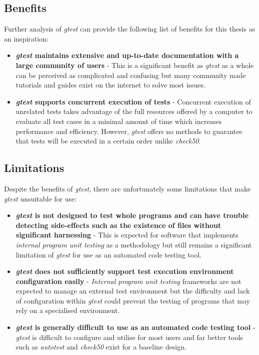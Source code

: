 \documentclass[hidelinks]{report}
\begin{document}
\subsection{Benefits}

Further analysis of \textit{gtest} can provide the following list of benefits for this thesis as an inspiration:
\begin{itemize}
	\item \textbf{\textit{gtest} maintains extensive and up-to-date documentation with a large community of users} - This is a significant benefit as \textit{gtest} as a whole can be perceived as complicated and confusing but many community made tutorials and guides exist on the internet to solve most issues.
	\item \textbf{\textit{gtest} supports concurrent execution of tests} - Concurrent execution of unrelated tests takes advantage of the full resources offered by a computer to evaluate all test cases in a minimal amount of time which increases performance and efficiency. However, \textit{gtest} offers no methods to guarantee that tests will be executed in a certain order unlike \textit{check50}. 
\end{itemize} 

\subsection{Limitations}

Despite the benefits of \textit{gtest}, there are unfortunately some limitations that make \textit{gtest} unsuitable for use:
\begin{itemize}
	\item \textbf{\textit{gtest} is not designed to test whole programs and can have trouble detecting side-effects such as the existence of files without significant harnessing} - This is expected for software that implements \textit{internal program unit testing} as a methodology but still remains a significant limitation of \textit{gtest} for use as an automated code testing tool.
	\item \textbf{\textit{gtest} does not sufficiently support test execution environment configuration easily} - \textit{Internal program unit testing} frameworks are not expected to manage an external test environment but the difficulty and lack of configuration within \textit{gtest} could prevent the testing of programs that may rely on a specialised environment.
	\item \textbf{\textit{gtest} is generally difficult to use as an automated code testing tool} - \textit{gtest} is difficult to configure and utilise for most users and far better tools such as \textit{autotest} and \textit{check50} exist for a baseline design.
\end{itemize}
\end{document}
